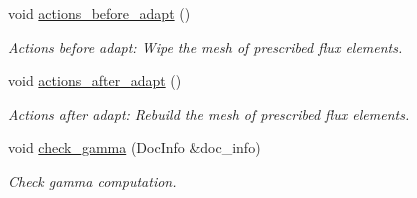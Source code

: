\begin{DoxyCompactItemize}
void \hyperlink{classFourierDecomposedHelmholtzProblem_acbc6f3c692463e5a098ccec7fe9029c1}{actions\+\_\+before\+\_\+adapt} ()
\begin{DoxyCompactList}\small\item\em Actions before adapt\+: Wipe the mesh of prescribed flux elements. \end{DoxyCompactList}\item 
void \hyperlink{classFourierDecomposedHelmholtzProblem_a3258e3817d8747aac0409eca1a24d14b}{actions\+\_\+after\+\_\+adapt} ()
\begin{DoxyCompactList}\small\item\em Actions after adapt\+: Rebuild the mesh of prescribed flux elements. \end{DoxyCompactList}\item 
void \hyperlink{classFourierDecomposedHelmholtzProblem_ac4f3f737660b11e8762a61bca999eb0f}{check\+\_\+gamma} (Doc\+Info \&doc\+\_\+info)
\begin{DoxyCompactList}\small\item\em Check gamma computation. \end{DoxyCompactList}\end{DoxyCompactItemize}
